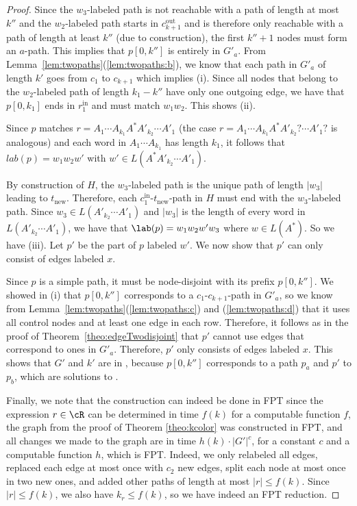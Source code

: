 \documentclass[a4paper,english]{lipics-v2016}
\theoremstyle{plain}
\begin{document}
\begin{proof}
  Since the $w_3$-labeled path is not reachable with a path of length
  at most $k''$ and the $w_2$-labeled path starts in $c_{k+1}^\text{out}$
  and is therefore only reachable with a path of length at least $k''$
  (due to construction), the first $k''+1$ nodes must
  form an $a$-path. This implies that $p[0,k'']$ is entirely in
  $G'_a$. 
 From
  Lemma~\ref{lem:twopaths}(\ref{lem:twopaths:b}), we know that each
  path in $G'_a$ of length $k'$ goes from $c_1$ to $c_{k+1}$ which implies (i).
Since all nodes that belong to the $w_2$-labeled path of length $k_1-k''$ have only one outgoing edge, we have that $p[0,k_1]$ ends in $r_1^\text{in}$ and must match $w_1w_2$. This shows (ii).

Since $p$ matches $r=A_1 \cdots A_{k_1} A^* A'_{k_2} \cdots A'_1$ (the case $r=A_1 \cdots A_{k_1} A^* A'_{k_2}? \cdots A'_1?$ is analogous) and each word in $A_1 \cdots A_{k_1}$ has length $k_1$, it follows that $lab(p)=w_1 w_2 w'$ with $w' \in L(A^* A'_{k_2} \cdots A'_1)$. 

  By construction of $H$, the $w_3$-labeled path is the unique path of
  length $|w_3|$ leading to $t_\text{new}$. Therefore, each $c_1^\text{in}$-$t_\text{new}$-path in
  $H$ must end with the $w_3$-labeled path. Since $w_3 \in L(A'_{k_2}
  \cdots A'_1)$ and $|w_3|$ is the length of every word in $L(A'_{k_2}
  \cdots A'_1)$, we have that $\lab(p) = w_1 w_2 w' w_3$ where $w\in
  L(A^*)$. So we have (iii).
  Let $p'$ be the part of $p$ labeled $w'$.
  We now show that $p'$ can only consist of edges labeled $x$.

    Since $p$ is a simple path, it must be node-disjoint with its prefix 
    $p[0,k'']$. We showed in (i) that $p[0,k'']$ corresponds to a $c_1$-$c_{k+1}$-path 
    in $G'_a$, so we know from Lemma~\ref{lem:twopaths}(\ref{lem:twopaths:c}) and (\ref{lem:twopaths:d}) that it uses all control nodes and at least one edge in each row. Therefore, it follows
    as in the proof of
  Theorem~\ref{theo:edgeTwodisjoint} that $p'$ cannot use edges that correspond to ones in $G'_a$.  Therefore, $p'$ only consists of edges labeled $x$. 
  This shows that $G'$ and $k'$ are in \knodecolordisjointpaths, 
  because $p[0,k'']$ corresponds to a path $p_a$ and $p'$ to $p_b$, which are solutions to \knodecolordisjointpaths.

Finally, we note that the construction can indeed be done in FPT since
the expression $r \in \cR$ can be determined in time $f(k)$ for a
computable function $f$, the graph from the proof of Theorem
\ref{theo:kcolor} was constructed in FPT, and all changes
we made to the graph are in time $ h(k) \cdot |G'|^c$, for a constant $c$ and a computable function $h$, which is FPT. Indeed, we only relabeled
all edges, replaced each edge at most once with $c_2$ new edges, split each node at most once in two new ones, and added other paths of length at most $|r|\leq f(k)$. Since $|r|\leq f(k)$, we also have $k_r\leq f(k)$, so we have indeed an FPT reduction.
\end{proof}
\end{document}
